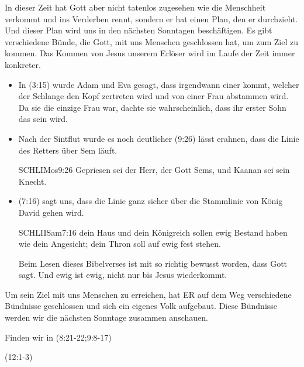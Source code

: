 \documentclass{mybib}
\begin{document}
\begin{spacing}{1.5}
\begin{block}[Paradies]
        In dieser Zeit hat Gott aber nicht tatenlos zugesehen wie die Menschheit verkommt und ins Verderben rennt, sondern er hat einen Plan, den er durchzieht. Und dieser Plan wird uns in den nächsten Sonntagen beschäftigen. Es gibt verschiedene Bünde, die Gott, mit uns Menschen geschlossen hat, um zum Ziel zu kommen. Das Kommen von Jesus unserem Erlöser wird im Laufe der Zeit immer konkreter.
        \begin{itemize}
            \item In (3:15) wurde Adam und Eva gesagt, dass irgendwann einer kommt, welcher der Schlange den Kopf zertreten wird und von einer Frau abstammen wird. Da sie die einzige Frau war, dachte sie wahrscheinlich, dass ihr erster Sohn das sein wird.
            \item Nach der Sintflut wurde es noch deutlicher (9:26) lässt erahnen, dass die Linie des Retters über Sem läuft.
            \begin{bibelbox}{SCHL}{IMos}{9:26}
                Gepriesen sei der Herr, der Gott Sems, und Kaanan sei sein Knecht.
            \end{bibelbox}
            \item {}(7:16) sagt uns, dass die Linie ganz sicher über die Stammlinie von König David gehen wird.
            \begin{bibelbox}{SCHL}{IISam}{7:16}
                dein Haus und dein Königreich sollen ewig Bestand haben wie dein Angesicht; dein Thron soll auf ewig fest stehen.
            \end{bibelbox}
            Beim Lesen dieses Bibelverses ist mit so richtig bewusst worden, dass Gott  sagt. Und ewig ist ewig, nicht nur bis Jesus wiederkommt. 
        \end{itemize}
        Um sein Ziel mit uns Menschen zu erreichen, hat ER auf dem Weg verschiedene Bündnisse geschlossen und sich ein eigenes Volk aufgebaut. Diese Bündnisse werden wir die nächsten Sonntage zusammen anschauen.        
    \end{block}
    \begin{block}
        Finden wir in (8:21-22;9:8-17)
    \end{block}
    \begin{block}
        (12:1-3)
    \end{block}
    \begin{block}

\end{block}
\end{spacing}
\end{document}
